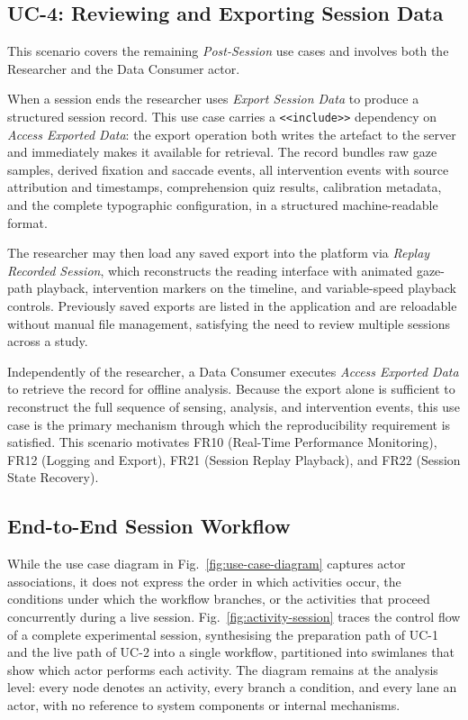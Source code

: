 \subsection{UC-4: Reviewing and Exporting Session Data}
\label{sec:uc4}

This scenario covers the remaining \textit{Post-Session} use cases and involves
both the Researcher and the Data Consumer actor.

When a session ends the researcher uses \textit{Export Session Data} to produce
a structured session record.
This use case carries a \texttt{<<include>>} dependency on \textit{Access Exported
Data}: the export operation both writes the artefact to the server and immediately
makes it available for retrieval.
The record bundles raw gaze samples, derived fixation and saccade events, all
intervention events with source attribution and timestamps, comprehension quiz
results, calibration metadata, and the complete typographic configuration,
in a structured machine-readable format.

The researcher may then load any saved export into the platform via
\textit{Replay Recorded Session}, which reconstructs the reading interface with
animated gaze-path playback, intervention markers on the timeline, and
variable-speed playback controls.
Previously saved exports are listed in the application and are reloadable without
manual file management, satisfying the need to review multiple sessions across a
study.

Independently of the researcher, a Data Consumer executes \textit{Access Exported
Data} to retrieve the record for offline analysis.
Because the export alone is sufficient to reconstruct the full sequence of
sensing, analysis, and intervention events, this use case is the primary
mechanism through which the reproducibility requirement is satisfied.
This scenario motivates FR10 (Real-Time Performance Monitoring), FR12 (Logging and Export), FR21 (Session Replay Playback), and FR22 (Session State Recovery).

\subsection{End-to-End Session Workflow}
\label{sec:activity-session}

While the use case diagram in Fig.~\ref{fig:use-case-diagram} captures actor associations, it does not express the order in which activities occur, the conditions under which the workflow branches, or the activities that proceed concurrently during a live session.
Fig.~\ref{fig:activity-session} traces the control flow of a complete experimental session, synthesising the preparation path of UC-1 and the live path of UC-2 into a single workflow, partitioned into swimlanes that show which actor performs each activity.
The diagram remains at the analysis level: every node denotes an activity, every branch a condition, and every lane an actor, with no reference to system components or internal mechanisms.

